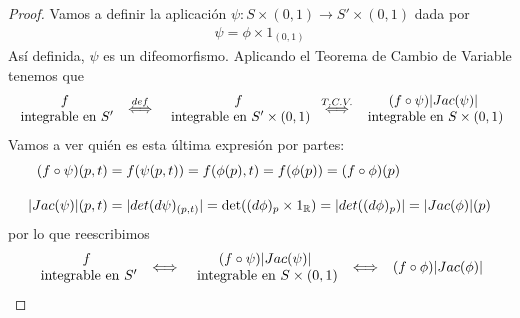 \begin{teo}
    \begin{proof}
        Vamos a definir la aplicación $\psi : S \times (0,1) \to S'\times (0,1)$ dada por 
        \begin{gather*}
            \psi = \phi \times 1_{(0,1)}
        \end{gather*}
        Así definida, $\psi$ es un difeomorfismo. Aplicando el Teorema de Cambio de Variable tenemos que
        \begin{gather*}
            \begin{array}{c}
                f \\
                \text{ integrable en $S'$}
            \end{array}
            \overset{def}{\iff }
            \begin{array}{c}
                f \\
                \text{ integrable en $S'\times (0,1)$}
            \end{array}
            \overset{T.C.V.}{\iff} 
            \begin{array}{c}
                (f\circ \psi)|Jac(\psi)| \\
                \text{ integrable en $S\times(0,1)$}
            \end{array}
        \end{gather*}
        Vamos a ver quién es esta última expresión por partes:
        \begin{align*}
            (f\circ \psi)(p,t) &= f(\psi(p,t)) = f(\phi(p), t) = f(\phi(p)) = (f\circ \phi)(p)\\[1em]
            |Jac(\psi)|(p,t) &= |det(d\psi)_{(p,t)}| = \det((d\phi)_p \times 1_{\mathbb{R}}) = |det((d\phi)_p)| = |Jac(\phi)|(p)
        \end{align*}
        por lo que reescribimos
        \begin{gather*}
            \begin{array}{c}
                f \\
                \text{ integrable en $S'$}
            \end{array}
            \iff 
            \begin{array}{c}
                (f\circ \psi)|Jac(\psi)| \\
                \text{ integrable en $S\times(0,1)$}
            \end{array}
            \iff 
            \begin{array}{c}
                (f\circ \phi)|Jac(\phi)| \\

\end{array}
\end{gather*}
\end{proof}
\end{teo}
